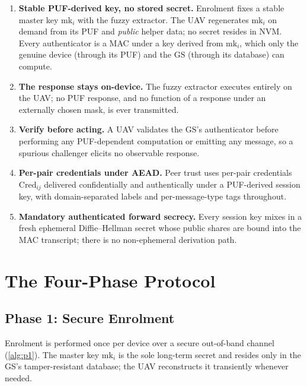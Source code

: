\documentclass[11pt,a4paper]{article}
\theoremstyle{jrnlplain}
\theoremstyle{jrnldef}
\newcommand{\GS}{\mathrm{GS}}
\newcommand{\Cred}{\mathrm{Cred}}
\newcommand{\mk}{\mathrm{mk}}
\begin{document}
\begin{enumerate}[leftmargin=1.6em,label=\textbf{P\arabic*.}]
\item \textbf{Stable PUF-derived key, no stored secret.} Enrolment fixes a
stable master key $\mk_i$ with the fuzzy extractor. The UAV regenerates
$\mk_i$ on demand from its PUF and \emph{public} helper data; no secret resides
in NVM. Every authenticator is a MAC under a key derived from $\mk_i$, which
only the genuine device (through its PUF) and the $\GS$ (through its database)
can compute.

\item \textbf{The response stays on-device.} The fuzzy extractor executes
entirely on the UAV; no PUF response, and no function of a response under an
externally chosen mask, is ever transmitted.

\item \textbf{Verify before acting.} A UAV validates the $\GS$'s
authenticator before performing any PUF-dependent computation or emitting any
message, so a spurious challenger elicits no observable response.

\item \textbf{Per-pair credentials under AEAD.} Peer trust uses per-pair
credentials $\Cred_{ij}$ delivered confidentially and authentically under a
PUF-derived session key, with domain-separated labels and per-message-type
tags throughout.

\item \textbf{Mandatory authenticated forward secrecy.} Every session key
mixes in a fresh ephemeral Diffie--Hellman secret whose public shares are
bound into the MAC transcript; there is no non-ephemeral derivation path.
\end{enumerate}

\section{The Four-Phase Protocol}
\label{sec:phases}

\subsection{Phase 1: Secure Enrolment}
\label{sec:p1}
Enrolment is performed once per device over a secure out-of-band channel
(\cref{alg:p1}). The master key $\mk_i$ is the sole long-term secret and
resides only in the GS's tamper-resistant database; the UAV reconstructs it
transiently whenever needed.
\end{document}
